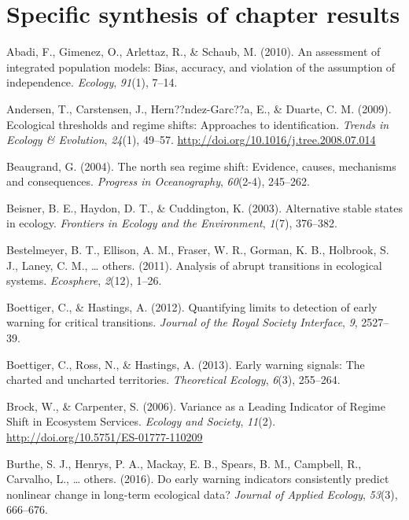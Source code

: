 \documentclass[12pt,twoside,openany]{reedthesis}
\begin{document}
\section{Specific synthesis of chapter
results}\label{specific-synthesis-of-chapter-results}

\hypertarget{refs}{}
\hypertarget{ref-abadi2010assessment}{}
Abadi, F., Gimenez, O., Arlettaz, R., \& Schaub, M. (2010). An
assessment of integrated population models: Bias, accuracy, and
violation of the assumption of independence. \emph{Ecology},
\emph{91}(1), 7--14.

\hypertarget{ref-andersen_ecological_2009}{}
Andersen, T., Carstensen, J., Hern??ndez-Garc??a, E., \& Duarte, C. M.
(2009). Ecological thresholds and regime shifts: Approaches to
identification. \emph{Trends in Ecology \& Evolution}, \emph{24}(1),
49--57. \url{http://doi.org/10.1016/j.tree.2008.07.014}

\hypertarget{ref-beaugrand2004north}{}
Beaugrand, G. (2004). The north sea regime shift: Evidence, causes,
mechanisms and consequences. \emph{Progress in Oceanography},
\emph{60}(2-4), 245--262.

\hypertarget{ref-beisner2003alternative}{}
Beisner, B. E., Haydon, D. T., \& Cuddington, K. (2003). Alternative
stable states in ecology. \emph{Frontiers in Ecology and the
Environment}, \emph{1}(7), 376--382.

\hypertarget{ref-bestelmeyer_analysis_2011}{}
Bestelmeyer, B. T., Ellison, A. M., Fraser, W. R., Gorman, K. B.,
Holbrook, S. J., Laney, C. M., \ldots{} others. (2011). Analysis of
abrupt transitions in ecological systems. \emph{Ecosphere},
\emph{2}(12), 1--26.

\hypertarget{ref-boettiger_quantifying_2012}{}
Boettiger, C., \& Hastings, A. (2012). Quantifying limits to detection
of early warning for critical transitions. \emph{Journal of the Royal
Society Interface}, \emph{9}, 2527--39.

\hypertarget{ref-boettiger_early_2013}{}
Boettiger, C., Ross, N., \& Hastings, A. (2013). Early warning signals:
The charted and uncharted territories. \emph{Theoretical Ecology},
\emph{6}(3), 255--264.

\hypertarget{ref-brock_variance_2006}{}
Brock, W., \& Carpenter, S. (2006). Variance as a Leading Indicator of
Regime Shift in Ecosystem Services. \emph{Ecology and Society},
\emph{11}(2). \url{http://doi.org/10.5751/ES-01777-110209}

\hypertarget{ref-burthe2016early}{}
Burthe, S. J., Henrys, P. A., Mackay, E. B., Spears, B. M., Campbell,
R., Carvalho, L., \ldots{} others. (2016). Do early warning indicators
consistently predict nonlinear change in long-term ecological data?
\emph{Journal of Applied Ecology}, \emph{53}(3), 666--676.
\end{document}
